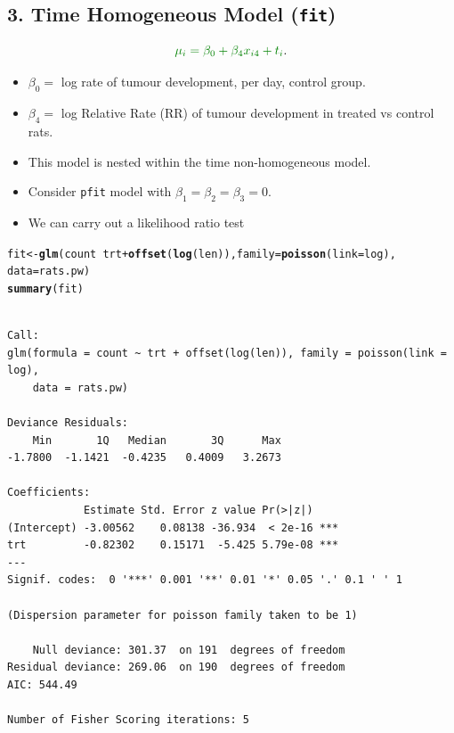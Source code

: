 \documentclass{article}\usepackage[]{graphicx}\usepackage[svgnames]{xcolor}
\makeatletter
\newcommand{\hlopt}[1]{\textcolor[rgb]{0,0,0}{#1}}%
\newcommand{\hlstd}[1]{\textcolor[rgb]{0.345,0.345,0.345}{#1}}%
\newcommand{\hlkwb}[1]{\textcolor[rgb]{0.69,0.353,0.396}{#1}}%
\newcommand{\hlkwc}[1]{\textcolor[rgb]{0.333,0.667,0.333}{#1}}%
\newcommand{\hlkwd}[1]{\textcolor[rgb]{0.737,0.353,0.396}{\textbf{#1}}}%
\newenvironment{kframe}{%
 \def\at@end@of@kframe{}%
 \ifinner\ifhmode%
  \def\at@end@of@kframe{\end{minipage}}%
  \begin{minipage}{\columnwidth}%
 \fi\fi%
 \def\FrameCommand##1{\hskip\@totalleftmargin \hskip-\fboxsep
 \colorbox{shadecolor}{##1}\hskip-\fboxsep
     \hskip-\linewidth \hskip-\@totalleftmargin \hskip\columnwidth}%
 \MakeFramed {\advance\hsize-\width
   \@totalleftmargin\z@ \linewidth\hsize
   \@setminipage}}%
 {\par\unskip\endMakeFramed%
 \at@end@of@kframe}
\newenvironment{knitrout}{}{} %
\let\log\relax%
\makeatother
\begin{document}
\subsection*{3. Time Homogeneous Model (\texttt{fit})}
\[ \textcolor{Green}{\log{\mu_i}=\beta_0+\beta_4x_{i4}+\log{t_i}}. \]
\begin{itemize}
    \item $ \beta_0= $ log rate of tumour development, per day, control group.
    \item $ \beta_4= $ log Relative Rate (RR) of tumour development in treated vs control rats.
    \item This model is nested within the time non-homogeneous model.
    \item Consider \texttt{pfit} model with $ \beta_1=\beta_2=\beta_3=0 $.
    \item We can carry out a likelihood ratio test
\end{itemize}
\begin{knitrout}
\color{fgcolor}\begin{kframe}
\begin{alltt}
\hlstd{fit} \hlkwb{<-} \hlkwd{glm}\hlstd{(count} \hlopt{~} \hlstd{trt} \hlopt{+} \hlkwd{offset}\hlstd{(}\hlkwd{log}\hlstd{(len)),} \hlkwc{family} \hlstd{=} \hlkwd{poisson}\hlstd{(}\hlkwc{link} \hlstd{= log),}
  \hlkwc{data} \hlstd{= rats.pw)}
\hlkwd{summary}\hlstd{(fit)}
\end{alltt}
\begin{verbatim}

Call:
glm(formula = count ~ trt + offset(log(len)), family = poisson(link = log), 
    data = rats.pw)

Deviance Residuals: 
    Min       1Q   Median       3Q      Max  
-1.7800  -1.1421  -0.4235   0.4009   3.2673  

Coefficients:
            Estimate Std. Error z value Pr(>|z|)    
(Intercept) -3.00562    0.08138 -36.934  < 2e-16 ***
trt         -0.82302    0.15171  -5.425 5.79e-08 ***
---
Signif. codes:  0 '***' 0.001 '**' 0.01 '*' 0.05 '.' 0.1 ' ' 1

(Dispersion parameter for poisson family taken to be 1)

    Null deviance: 301.37  on 191  degrees of freedom
Residual deviance: 269.06  on 190  degrees of freedom
AIC: 544.49

Number of Fisher Scoring iterations: 5
\end{verbatim}
\end{kframe}
\end{knitrout}
\end{document}
